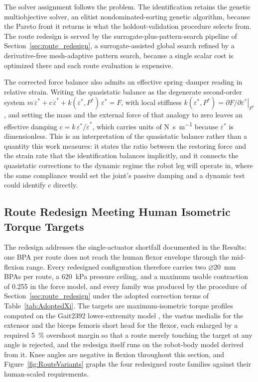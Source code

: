 \documentclass[utf8]{FrontiersinHarvard} %
\begin{document}
The solver assignment follows the problem. The identification retains the genetic multiobjective solver, an elitist nondominated-sorting genetic algorithm, because the Pareto front it returns is what the holdout-validation procedure selects from. The route redesign is served by the surrogate-plus-pattern-search pipeline of Section~\ref{sec:route_redesign}, a surrogate-assisted global search refined by a derivative-free mesh-adaptive pattern search, because a single scalar cost is optimized there and each route evaluation is expensive.

The corrected force balance also admits an effective spring--damper reading in relative strain. Writing the quasistatic balance as the degenerate second-order system $m\,\ddot{\varepsilon}^{*} + c\,\dot{\varepsilon}^{*} + k(\varepsilon^{*}, P^{*})\,\varepsilon^{*} = F$, with local stiffness $k(\varepsilon^{*}, P^{*}) = \left.\partial F/\partial\varepsilon^{*}\right|_{P^{*}}$, and setting the mass and the external force of that analogy to zero leaves an effective damping $c = k\,\varepsilon^{*}/\dot{\varepsilon}^{*}$, which carries units of \unit{\newton\second\per\metre} because $\varepsilon^{*}$ is dimensionless. This is an interpretation of the quasistatic balance rather than a quantity this work measures: it states the ratio between the restoring force and the strain rate that the identification balances implicitly, and it connects the quasistatic corrections to the dynamic regime the robot leg will operate in, where the same compliance would set the joint's passive damping and a dynamic test could identify $c$ directly.

\subsection{Route Redesign Meeting Human Isometric Torque Targets}\label{sec:route_redesign_results}

The redesign addresses the single-actuator shortfall documented in the Results: one BPA per route does not reach the human flexor envelope through the mid-flexion range. Every redesigned configuration therefore carries two $\diameter$\qty{20}{\mm} BPAs per route, a \qty{620}{\kPa} pressure ceiling, and a maximum usable contraction of 0.255 in the force model, and every family was produced by the procedure of Section~\ref{sec:route_redesign} under the adopted correction terms of Table~\ref{tab:AdoptedXi}. The targets are maximum-isometric torque profiles computed on the Gait2392 lower-extremity model \citep{delp_opensim_2007, seth_opensim_2018}, the vastus medialis for the extensor and the biceps femoris short head for the flexor, each enlarged by a required \qty{5}{\percent} overshoot margin so that a route merely touching the target at any angle is rejected, and the redesign itself runs on the robot-body model derived from it. Knee angles are negative in flexion throughout this section, and Figure~\ref{fig:RouteVariants} graphs the four redesigned route families against their human-scaled requirements.
\end{document}
